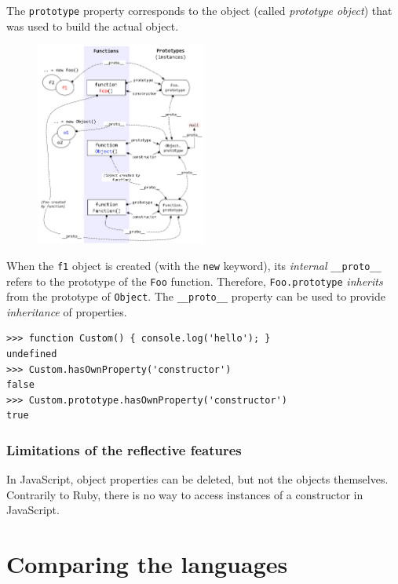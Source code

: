 \documentclass[a4paper,10pt]{article}
\begin{document}
The \lstinline|prototype| property corresponds to the object (called \textit{prototype object}) that was used to build the actual object.

\begin{figure}[h]
    \centering
    \includegraphics[width=0.5\textwidth]{jstypes.png}
\end{figure}

When the \lstinline|f1| object is created (with the \lstinline|new| keyword), its \textit{internal} \lstinline|__proto__| refers to the prototype of the \lstinline|Foo| function.
Therefore, \lstinline|Foo.prototype| \textit{inherits} from the prototype of \lstinline|Object|.
The \lstinline|__proto__| property can be used to provide \textit{inheritance} of properties.

\begin{lstlisting}
>>> function Custom() { console.log('hello'); }
undefined
>>> Custom.hasOwnProperty('constructor')
false
>>> Custom.prototype.hasOwnProperty('constructor')
true
\end{lstlisting}


\subsubsection{Limitations of the reflective features}

In JavaScript, object properties can be deleted, but not the objects themselves.
Contrarily to Ruby, there is no way to access instances of a constructor in JavaScript.



\section{Comparing the languages}
\end{document}
